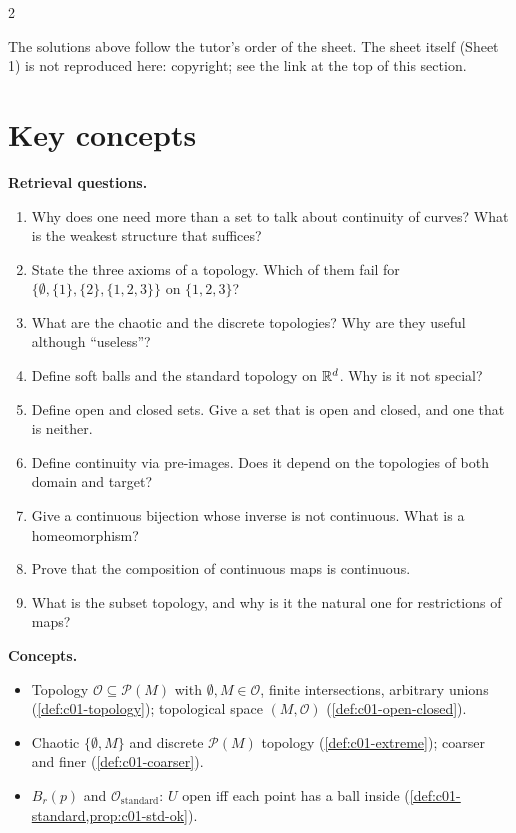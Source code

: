 \begin{paracol}{2}
\begin{coursenote}
The solutions above follow the tutor's order of the sheet. The sheet itself (Sheet 1) is not reproduced here: copyright; see the link at the top of this section.
\end{coursenote}

\section*{Key concepts}
\begin{keyconcepts}
\textbf{Retrieval questions.}
\begin{enumerate}
  \item Why does one need more than a set to talk about continuity of curves? What is the weakest structure that suffices?
  \item State the three axioms of a topology. Which of them fail for $\{\emptyset,\{1\},\{2\},\{1,2,3\}\}$ on $\{1,2,3\}$?
  \item What are the chaotic and the discrete topologies? Why are they useful although ``useless''?
  \item Define soft balls and the standard topology on $\mathbb{R}^d$. Why is it not special?
  \item Define open and closed sets. Give a set that is open and closed, and one that is neither.
  \item Define continuity via pre-images. Does it depend on the topologies of both domain and target?
  \item Give a continuous bijection whose inverse is not continuous. What is a homeomorphism?
  \item Prove that the composition of continuous maps is continuous.
  \item What is the subset topology, and why is it the natural one for restrictions of maps?
\end{enumerate}
\textbf{Concepts.}
\begin{itemize}
  \item Topology $\mathcal O\subseteq\mathcal P(M)$ with $\emptyset,M\in\mathcal O$, finite intersections, arbitrary unions (\cref{def:c01-topology}); topological space $(M,\mathcal O)$ (\cref{def:c01-open-closed}).
  \item Chaotic $\{\emptyset,M\}$ and discrete $\mathcal P(M)$ topology (\cref{def:c01-extreme}); coarser and finer (\cref{def:c01-coarser}).
  \item $B_r(p)$ and $\mathcal O_{\mathrm{standard}}$: $U$ open iff each point has a ball inside (\cref{def:c01-standard,prop:c01-std-ok}).

\end{itemize}
\end{keyconcepts}
\end{paracol}
